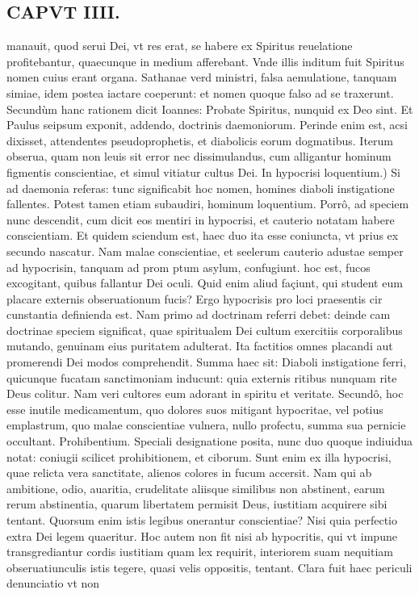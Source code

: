 \documentclass{article}
\begin{document}
\begin{pages}
\section*{CAPVT IIII. }
\marginpar{[ p.45 ]}\pstart manauit, quod serui Dei, vt res erat, se habere ex Spiritus reuelatione profitebantur, quaecunque in medium afferebant. Vnde illis inditum fuit Spiritus nomen cuius erant organa. Sathanae verd ministri, falsa aemulatione, tanquam simiae, idem postea iactare coeperunt: et nomen quoque falso ad se traxerunt. Secundùm hanc rationem dicit Ioannes: Probate Spiritus, nunquid ex Deo sint. Et Paulus seipsum exponit, addendo, doctrinis daemoniorum. Perinde enim est, acsi dixisset, attendentes pseudoprophetis, et diabolicis eorum dogmatibus. Iterum obserua, quam non leuis sit error nec dissimulandus, cum alligantur hominum figmentis conscientiae, et simul vitiatur cultus Dei.  \pend\pstart In hypocrisi loquentium.) Si ad daemonia referas: tunc significabit hoc nomen, homines diaboli instigatione fallentes. Potest tamen etiam subaudiri, hominum loquentium. Porrô, ad speciem nunc descendit, cum dicit eos mentiri in hypocrisi, et cauterio notatam habere conscientiam. Et quidem sciendum est, haec duo ita esse coniuncta, vt prius ex secundo nascatur. Nam malae conscientiae, et seelerum cauterio adustae semper ad hypocrisin, tanquam ad prom ptum asylum, confugiunt. hoc est, fucos excogitant, quibus fallantur Dei oculi. Quid enim aliud façiunt, qui student eum placare externis obseruationum fucis? Ergo hypocrisis pro loci praesentis cir cunstantia definienda est. Nam primo ad doctrinam referri debet: deinde cam doctrinae speciem significat, quae spiritualem Dei cultum exercitiis corporalibus mutando, genuinam eius puritatem adulterat. Ita factitios omnes placandi aut promerendi Dei modos comprehendit. Summa haec sit: Diaboli instigatione ferri, quicunque fucatam sanctimoniam inducunt: quia externis ritibus nunquam rite Deus colitur. Nam veri cultores eum adorant in spiritu et veritate. Secundô, hoc esse inutile medicamentum, quo dolores suos mitigant hypocritae, vel potius emplastrum, quo malae conscientiae vulnera, nullo profectu, summa sua pernicie occultant.  \pend\pstart Prohibentium. Speciali designatione posita, nunc duo quoque indiuidua notat: coniugii scilicet prohibitionem, et ciborum. Sunt enim ex illa hypocrisi, quae relicta vera sanctitate, alienos colores in fucum accersit. Nam qui ab ambitione, odio, auaritia, crudelitate aliisque similibus non abstinent, earum rerum abstinentia, quarum libertatem permisit Deus, iustitiam acquirere sibi tentant. Quorsum enim istis legibus onerantur conscientiae? Nisi quia perfectio extra Dei legem quaeritur. Hoc autem non fit nisi ab hypocritis, qui vt impune transgrediantur cordis iustitiam quam lex requirit, interiorem suam nequitiam obseruatiunculis istis tegere, quasi velis oppositis, tentant. Clara fuit haec periculi denunciatio vt non  \pend

\end{pages}
\end{document}
